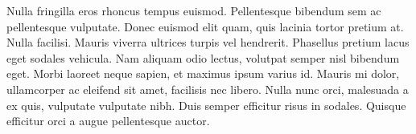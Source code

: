 \documentclass[11pt]{article}
\begin{document}
Nulla fringilla eros rhoncus tempus euismod. Pellentesque bibendum sem
ac pellentesque vulputate. Donec euismod elit quam, quis lacinia tortor
pretium at. Nulla facilisi. Mauris viverra ultrices turpis vel
hendrerit. Phasellus pretium lacus eget sodales vehicula. Nam aliquam
odio lectus, volutpat semper nisl bibendum eget. Morbi laoreet neque
sapien, et maximus ipsum varius id. Mauris mi dolor, ullamcorper ac
eleifend sit amet, facilisis nec libero. Nulla nunc orci, malesuada a ex
quis, vulputate vulputate nibh. Duis semper efficitur risus in sodales.
Quisque efficitur orci a augue pellentesque auctor.
 


    
    
    
    
\end{document}
